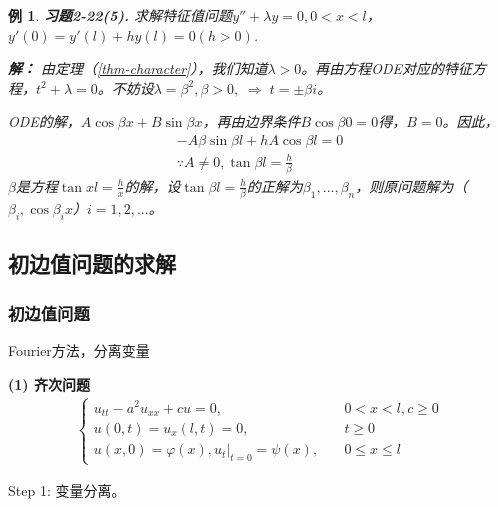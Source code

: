 \documentclass[11pt, a4paper]{article}
\theoremstyle{theorem}
\newtheorem{eg}[thm]{例}
\begin{document}
\begin{eg} \textbf{习题2-22(5).} 求解特征值问题$y'' + \lambda y = 0, 0 < x < l$，$y'(0) = y'(l) + h y(l) = 0 (h > 0)$.

\textbf{解：} 由定理（\ref{thm-character}），我们知道$\lambda > 0$。再由方程ODE对应的特征方程，$t^2 + \lambda = 0$。不妨设$\lambda = \beta^2, \beta > 0, \; \Rightarrow \; t = \pm \beta i$。

ODE的解，$A \cos \beta x + B \sin \beta x$，再由边界条件$B \cos \beta 0 = 0$得，$B = 0$。因此，
\begin{align*}
-A \beta \sin \beta l + h A \cos \beta l = 0 \\
\because A \neq 0, \tan \beta l = \frac{h}{\beta}
\end{align*}
$\beta$是方程$\tan x l = \frac{h}{x}$的解，设$\tan \beta l = \frac{h}{\beta}$的正解为$\beta_1, ..., \beta_n$，则原问题解为（$\beta_i, \cos \beta_i x$）$i = 1,2,...$。
\end{eg}

\subsection{初边值问题的求解}

\subsubsection{初边值问题}

Fourier方法，分离变量

\textbf{(1) 齐次问题}
    \begin{align}
    \label{Q3-10-1}
        \begin{cases}
        u_{tt} - a^2 u_{xx} + cu = 0, \quad &0 < x < l, c \geq 0 \\
        u(0,t) = u_x(l, t) = 0, \quad &t \geq 0 \\
        u(x,0) = \varphi(x), u_t \bigg|_{t = 0} = \psi(x), \quad &0 \leq x \leq l
        \end{cases}
    \end{align}

    Step 1: 变量分离。
\end{document}
